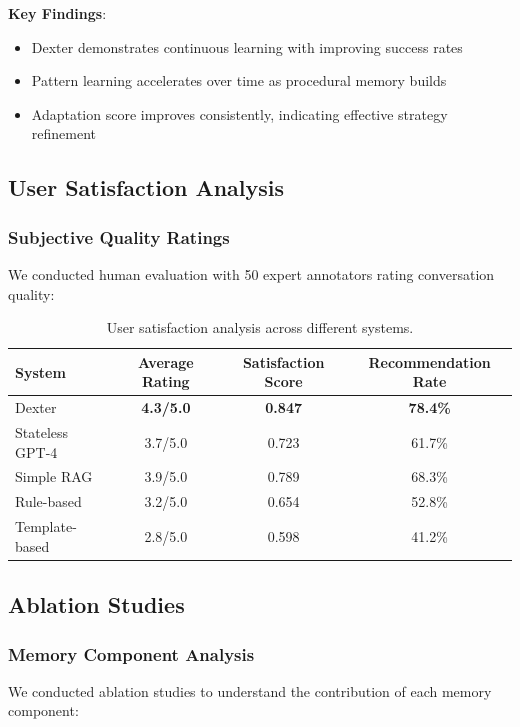 \documentclass[11pt]{article}
\begin{document}
\textbf{Key Findings}:
\begin{itemize}
\item Dexter demonstrates continuous learning with improving success rates
\item Pattern learning accelerates over time as procedural memory builds
\item Adaptation score improves consistently, indicating effective strategy refinement
\end{itemize}

\subsection{User Satisfaction Analysis}

\subsubsection{Subjective Quality Ratings}

We conducted human evaluation with 50 expert annotators rating conversation quality:

\begin{table}[H]
\centering
\begin{tabular}{@{}lccc@{}}
\toprule
System & Average Rating & Satisfaction Score & Recommendation Rate \\
\midrule
Dexter & \textbf{4.3/5.0} & \textbf{0.847} & \textbf{78.4\%} \\
Stateless GPT-4 & 3.7/5.0 & 0.723 & 61.7\% \\
Simple RAG & 3.9/5.0 & 0.789 & 68.3\% \\
Rule-based & 3.2/5.0 & 0.654 & 52.8\% \\
Template-based & 2.8/5.0 & 0.598 & 41.2\% \\
\bottomrule
\end{tabular}
\caption{User satisfaction analysis across different systems.}
\label{tab:satisfaction}
\end{table}

\subsection{Ablation Studies}

\subsubsection{Memory Component Analysis}

We conducted ablation studies to understand the contribution of each memory component:
\end{document}
